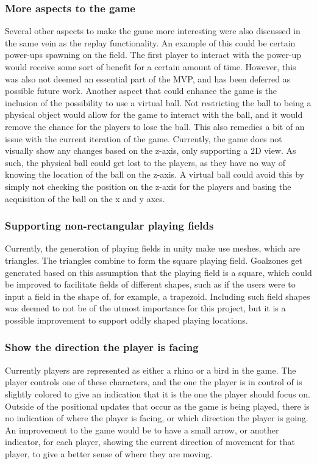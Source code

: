 \subsubsection{More aspects to the game}
Several other aspects to make the game more interesting were also discussed in the same vein as the replay functionality.
An example of this could be certain power-ups spawning on the field.
The first player to interact with the power-up would receive some sort of benefit for a certain amount of time.
However, this was also not deemed an essential part of the MVP, and has been deferred as possible future work.
Another aspect that could enhance the game is the inclusion of the possibility to use a virtual ball.
Not restricting the ball to being a physical object would allow for the game to interact with the ball, and it would remove the chance for the players to lose the ball.
This also remedies a bit of an issue with the current iteration of the game.
Currently, the game does not visually show any changes based on the z-axis, only supporting a 2D view.
As such, the physical ball could get lost to the players, as they have no way of knowing the location of the ball on the z-axis.
A virtual ball could avoid this by simply not checking the position on the z-axis for the players and basing the acquisition of the ball on the x and y axes. 

\subsubsection{Supporting non-rectangular playing fields}
Currently, the generation of playing fields in unity make use meshes, which are triangles.
The triangles combine to form the square playing field.
Goalzones get generated based on this assumption that the playing field is a square, which could be improved to facilitate fields of different shapes, such as if the users were to input a field in the shape of, for example, a trapezoid.
Including such field shapes was deemed to not be of the utmost importance for this project, but it is a possible improvement to support oddly shaped playing locations.

\subsubsection{Show the direction the player is facing}
Currently players are represented as either a rhino or a bird in the game.
The player controls one of these characters, and the one the player is in control of is slightly colored to give an indication that it is the one the player should focus on.
Outside of the positional updates that occur as the game is being played, there is no indication of where the player is facing, or which direction the player is going.
An improvement to the game would be to have a small arrow, or another indicator, for each player, showing the current direction of movement for that player, to give a better sense of where they are moving.

